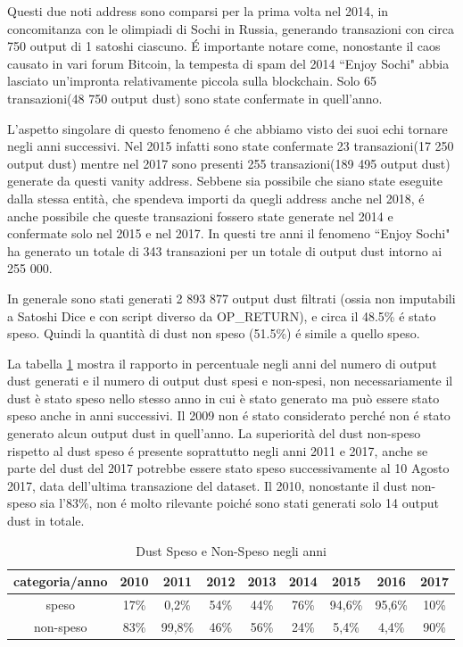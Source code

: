 Questi due noti address sono comparsi per la prima volta nel 2014, in concomitanza con le olimpiadi di Sochi in Russia, generando transazioni con circa 750 output di 1 satoshi ciascuno. É importante notare come, nonostante il caos causato in vari forum Bitcoin, la tempesta di spam del 2014 ``Enjoy Sochi" abbia lasciato un'impronta relativamente piccola sulla blockchain. Solo 65 transazioni(48 750 output dust) sono state confermate in quell'anno.

L'aspetto singolare di questo fenomeno é che abbiamo visto dei suoi echi tornare negli anni successivi. Nel 2015 infatti sono state confermate 23 transazioni(17 250 output dust) mentre nel 2017 sono presenti 255 transazioni(189 495 output dust) generate da questi vanity address. Sebbene sia possibile che siano state eseguite dalla stessa entità, che spendeva importi da quegli address anche nel 2018, é anche possibile che queste transazioni fossero state generate nel 2014 e confermate solo nel 2015 e nel 2017. In questi tre anni il fenomeno ``Enjoy Sochi" ha generato un totale di 343 transazioni per un totale di output dust intorno ai 255 000.

In generale sono stati generati 2 893 877 output dust filtrati (ossia non imputabili a Satoshi Dice e con script diverso da OP\_RETURN), e circa il 48.5\% é stato speso. Quindi la quantità di dust non speso (51.5\%) é simile a quello speso. 

La tabella \ref{tab:dust_spent_unspent} mostra il rapporto in percentuale negli anni del numero di output dust generati e il numero di output dust spesi e non-spesi, non necessariamente il dust è stato speso nello stesso anno in cui è stato generato ma può essere stato speso anche in anni successivi. Il 2009 non é stato considerato perché non é stato generato alcun output dust in quell'anno. La superiorità del dust non-speso rispetto al dust speso é presente soprattutto negli anni 2011 e 2017, anche se parte del dust del 2017 potrebbe essere stato speso successivamente al 10 Agosto 2017, data dell'ultima transazione del dataset. Il 2010, nonostante il dust non-speso sia l'83\%, non é molto rilevante poiché sono stati generati solo 14 output dust in totale. 
\begin{table}[H]
    \centering
    \begin{tabular}{|c|c|c|c|c|c|c|c|c|}
        \hline
           categoria/anno   & 2010 & 2011 & 2012 & 2013 & 2014 & 2015 & 2016 & 2017\\
        \hline 
         speso &  17\% & 0,2\% & 54\% & 44\% & 76\% & 94,6\% & 95,6\% & 10\% \\
         \hline
         non-speso & 83\% & 99,8\% & 46\% & 56\% & 24\% & 5,4\% & 4,4\% & 90\%  \\
         \hline
    \end{tabular}
    \caption{Dust Speso e Non-Speso negli anni}
    \label{tab:dust_spent_unspent}
\end{table}

